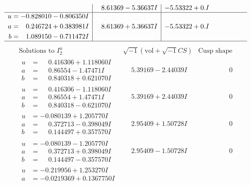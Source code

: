 \documentclass[1p]{elsarticle_modified}
\theoremstyle{definition}
\newcommand{\I}{\sqrt{-1}}
\begin{document}
$$\begin{array}{c|c|c}
 & \phantom{-}8.61369 - 5.36637 I & -5.53322 + 0. I\phantom{ +0.000000I} \\ \hline\begin{aligned}
u &= -0.828010 - 0.806350 I \\
a &= \phantom{-}0.246724 + 0.383981 I \\
b &= \phantom{-}1.089150 - 0.711472 I\end{aligned}
 & \phantom{-}8.61369 + 5.36637 I & -5.53322 + 0. I\phantom{ +0.000000I}\\
 \hline 
 \end{array}$$\newpage$$\begin{array}{c|c|c}  
\text{Solutions to }I^u_{2}& \I (\text{vol} + \sqrt{-1}CS) & \text{Cusp shape}\\
 \hline 
\begin{aligned}
u &= \phantom{-}0.416306 + 1.118060 I \\
a &= \phantom{-}0.86554 - 1.47471 I \\
b &= \phantom{-}0.840318 + 0.621070 I\end{aligned}
 & \phantom{-}5.39169 - 2.44039 I & \phantom{-0.000000 } 0 \\ \hline\begin{aligned}
u &= \phantom{-}0.416306 - 1.118060 I \\
a &= \phantom{-}0.86554 + 1.47471 I \\
b &= \phantom{-}0.840318 - 0.621070 I\end{aligned}
 & \phantom{-}5.39169 + 2.44039 I & \phantom{-0.000000 } 0 \\ \hline\begin{aligned}
u &= -0.080139 + 1.205770 I \\
a &= \phantom{-}0.372713 - 0.398049 I \\
b &= \phantom{-}0.144497 + 0.357570 I\end{aligned}
 & \phantom{-}2.95409 + 1.50728 I & \phantom{-0.000000 } 0 \\ \hline\begin{aligned}
u &= -0.080139 - 1.205770 I \\
a &= \phantom{-}0.372713 + 0.398049 I \\
b &= \phantom{-}0.144497 - 0.357570 I\end{aligned}
 & \phantom{-}2.95409 - 1.50728 I & \phantom{-0.000000 } 0 \\ \hline\begin{aligned}
u &= -0.219956 + 1.253270 I \\
a &= -0.0219369 + 0.1367750 I \\

\end{aligned}
\end{array}$$
\end{document}

